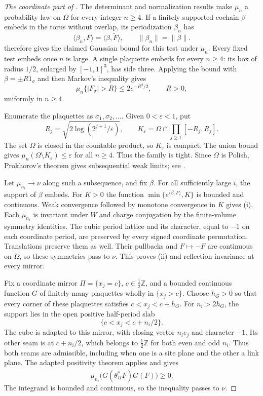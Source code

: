 \documentclass[11pt,letterpaper,reqno]{amsart}
\newcommand{\Z}{\mathbb Z}
\begin{document}
\begin{proof}[The coordinate part of ]
The determinant and normalization results make $\mu_n$ a probability
law on $\Omega$ for every integer $n\ge4$. If a finitely supported
cochain $\beta$ embeds in the torus without overlap, its
periodization $\beta_n$ has
\[
 \langle\beta_n,F\rangle=\langle\beta,\widetilde F\rangle,
 \qquad \|\beta_n\|=\|\beta\|.
\]
 therefore gives the claimed Gaussian
bound for this test under $\mu_n$. Every fixed test embeds once
$n$ is large. A single plaquette embeds for every $n\ge4$: its
box of radius $1/2$, enlarged by $[-1,1]^3$, has side three.
Applying the bound with $\beta=\pm R1_\sigma$ and then Markov's
inequality gives
\[
 \mu_n\{|F_\sigma|>R\}\le2e^{-R^2/2},\qquad R>0,
\]
uniformly in $n\ge4$.

Enumerate the plaquettes as $\sigma_1,\sigma_2,\ldots$. Given
$0<\varepsilon<1$, put
\[
 R_j=\sqrt{2\log(2^{j+1}/\varepsilon)},\qquad
 K_\varepsilon=\Omega\cap\prod_{j\ge1}[-R_j,R_j].
\]
The set $\Omega$ is closed in the countable product, so
$K_\varepsilon$ is compact. The union bound gives
$\mu_n(\Omega\setminus K_\varepsilon)\le\varepsilon$ for all
$n\ge4$. Thus the family is tight. Since $\Omega$ is Polish,
Prokhorov's theorem gives subsequential weak limits; see
\cite[Theorem~1.1]{Sorensen}.

Let $\mu_{n_i}\to\nu$ along such a subsequence, and fix $\beta$.
For all sufficiently large $i$, the support of $\beta$ embeds.
For $K>0$ the function
$\min\{e^{\langle\beta,F\rangle},K\}$ is bounded and continuous.
Weak convergence followed by monotone convergence in $K$ gives
\textup{(i)}. Each $\mu_{n_i}$ is invariant under $W$ and charge
conjugation by the finite-volume symmetry identities. The cubic
period lattice and its character, equal to $-1$ on each coordinate
period, are preserved by every signed coordinate permutation.
Translations preserve them as well. Their pullbacks and $F\mapsto-F$
are continuous on $\Omega$, so these symmetries pass to $\nu$.
This proves \textup{(ii)} and reflection invariance at every mirror.

Fix a coordinate mirror $\Pi=\{x_j=c\}$, $c\in\tfrac12\Z$,
and a bounded continuous function $G$ of finitely many plaquettes
wholly in $\{x_j>c\}$. Choose $h_G>0$ so that every corner of
these plaquettes satisfies $c<x_j<c+h_G$. For $n_i>2h_G$, the
support lies in the open positive half-period slab
\[
 \{c<x_j<c+n_i/2\}.
\]
The cube is adapted to this mirror, with closing vector $n_ie_j$
and character $-1$. Its other seam is at $c+n_i/2$, which belongs
to $\tfrac12\Z$ for both even and odd $n_i$. Thus both seams are
admissible, including when one is a site plane and the other a
link plane. The adapted positivity theorem applies and gives
\[
 \mu_{n_i}\bigl(\overline{G(\theta_\Pi^*F)}G(F)\bigr)\ge0.
\]
The integrand is bounded and continuous, so the inequality passes
to $\nu$.


\end{proof}
\end{document}

